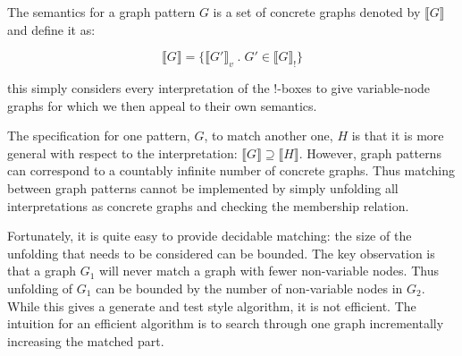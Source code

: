 \documentclass[runningheads]{llncs}
\newcommand{\vinterp}[1]{\llbracket #1 \rrbracket_v}
\newcommand{\binterp}[1]{\llbracket #1 \rrbracket_!}
\newcommand{\minterp}[1]{\llbracket #1 \rrbracket}
\begin{document}
The semantics for a graph
pattern $G$ is a set of concrete graphs denoted by $\minterp{G}$ and
define it as:

$$\minterp{G} = \{\vinterp{G'}\;.\; G' \in \binterp{G}\}$$

\noindent this simply considers every interpretation of the !-boxes to
give variable-node graphs for which we then appeal to their own
semantics. 

The specification for one pattern,
$G$, to match another one, $H$ is that it is more general with respect
to the interpretation: $\minterp{G} \supseteq \minterp{H}$. However,
graph patterns can correspond to a countably infinite number of
concrete graphs. Thus matching between graph patterns cannot be
implemented by simply unfolding all interpretations as concrete graphs
and checking the membership relation.

Fortunately, it is quite easy to provide decidable matching: the size
of the unfolding that needs to be considered can be bounded. The key
observation is that a graph $G_1$ will never match a graph with fewer
non-variable nodes. Thus unfolding of $G_1$ can be bounded by the
number of non-variable nodes in $G_2$. While this gives a generate and
test style algorithm, it is not efficient. The intuition for an
efficient algorithm is to search through one graph incrementally
increasing the matched part.  


%
%

%

\end{document}
